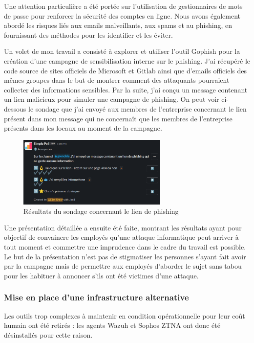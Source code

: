Une attention particulière a été portée sur l'utilisation de gestionnaires de mots de passe pour renforcer la sécurité des comptes en ligne.
Nous avons également abordé les risques liés aux emails malveillants, aux spams et au phishing, en fournissant des méthodes pour les identifier et les éviter.

Un volet de mon travail a consisté à explorer et utiliser l'outil Gophish pour la création d'une campagne de sensibilisation interne sur le phishing.
J'ai récupéré le code source de sites officiels de Microsoft et Gitlab ainsi que d'emails officiels des mêmes groupes dans le but de montrer comment des attaquants pourraient collecter des informations sensibles.
Par la suite, j'ai conçu un message contenant un lien malicieux pour simuler une campagne de phishing.
On peut voir ci-dessous le sondage que j'ai envoyé aux membres de l'entreprise concernant le lien présent dans mon message qui ne concernaît que les membres de l'entreprise présents dans les locaux au moment de la campagne.

\begin{figure}[ht!]
    \centering
    \includegraphics[width=0.66\textwidth]{paper/figures/poll.png}
    \caption{Résultats du sondage concernant le lien de phishing}
    \label{fig:poll}
\end{figure}

Une présentation détaillée a ensuite été faite, montrant les résultats ayant pour objectif de convaincre les employés qu'une attaque informatique peut arriver à tout moment et commettre une imprudence dans le cadre du travail est possible.
Le but de la présentation n'est pas de stigmatiser les personnes s'ayant fait avoir par la campagne mais de permettre aux employés d'aborder le sujet sans tabou pour les habituer à annoncer s'ils ont été victimes d'une attaque.


\subsubsection{Mise en place d'une infrastructure alternative}
Les outils trop complexes à maintenir en condition opérationnelle pour leur coût humain ont été retirés : les agents Wazuh et Sophos ZTNA ont donc été désinstallés pour cette raison.

